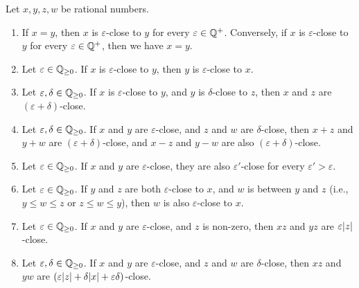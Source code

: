 \setcounter{thm}{6}
\begin{prop}\label{i:4.3.7}
  Let \(x, y, z, w\) be rational numbers.
  \begin{enumerate}
    \item If \(x = y\), then \(x\) is \(\varepsilon\)-close to \(y\) for every \(\varepsilon \in \mathbb{Q}^+\).
          Conversely, if \(x\) is \(\varepsilon\)-close to \(y\) for every \(\varepsilon \in \mathbb{Q}^+\), then we have \(x = y\).
    \item Let \(\varepsilon \in \mathbb{Q}_{\geq 0}\).
          If \(x\) is \(\varepsilon\)-close to \(y\), then \(y\) is \(\varepsilon\)-close to \(x\).
    \item Let \(\varepsilon, \delta \in \mathbb{Q}_{\geq 0}\).
          If \(x\) is \(\varepsilon\)-close to \(y\), and \(y\) is \(\delta\)-close to \(z\), then \(x\) and \(z\) are \((\varepsilon + \delta)\)-close.
    \item Let \(\varepsilon, \delta \in \mathbb{Q}_{\geq 0}\).
          If \(x\) and \(y\) are \(\varepsilon\)-close, and \(z\) and \(w\) are \(\delta\)-close, then \(x + z\) and \(y + w\) are \((\varepsilon + \delta)\)-close, and \(x - z\) and \(y - w\) are also \((\varepsilon + \delta)\)-close.
    \item Let \(\varepsilon \in \mathbb{Q}_{\geq 0}\).
          If \(x\) and \(y\) are \(\varepsilon\)-close, they are also \(\varepsilon'\)-close for every \(\varepsilon' > \varepsilon\).
    \item Let \(\varepsilon \in \mathbb{Q}_{\geq 0}\).
          If \(y\) and \(z\) are both \(\varepsilon\)-close to \(x\), and \(w\) is between \(y\) and \(z\) (i.e., \(y \leq w \leq z\) or \(z \leq w \leq y\)), then \(w\) is also \(\varepsilon\)-close to \(x\).
    \item Let \(\varepsilon \in \mathbb{Q}_{\geq 0}\).
          If \(x\) and \(y\) are \(\varepsilon\)-close, and \(z\) is non-zero, then \(xz\) and \(yz\) are \(\varepsilon\abs{z}\)-close.
    \item Let \(\varepsilon, \delta \in \mathbb{Q}_{\geq 0}\).
          If \(x\) and \(y\) are \(\varepsilon\)-close, and \(z\) and \(w\) are \(\delta\)-close, then \(xz\) and \(yw\) are \((\varepsilon\abs{z} + \delta\abs{x} + \varepsilon\delta)\)-close.
  \end{enumerate}
\end{prop}

